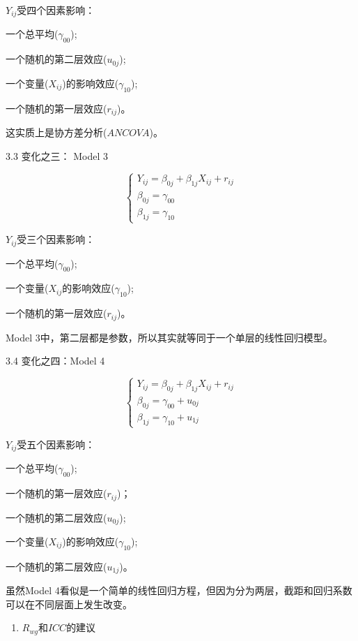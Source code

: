 \documentclass[
]{book}
\providecommand{\tightlist}{%
  \setlength{\itemsep}{0pt}\setlength{\parskip}{0pt}}
\begin{document}
\(Y_{ij}\)受四个因素影响：

一个总平均(\(\gamma_{00}\));

一个随机的第二层效应(\(u_{0j}\));

一个变量(\(X_{ij}\))的影响效应(\(\gamma_{10}\));

一个随机的第一层效应(\(r_{ij}\))。

这实质上是协方差分析(\(ANCOVA\))。

3.3 变化之三： Model 3

\[
\left\{ \begin{aligned} 
        Y_{ij} = \beta_{0j} + \beta_{1j}X_{ij}+ r_{ij} \\
        \beta_{0j} = \gamma_{00} \\
        \beta_{1j} = \gamma_{10}       
\end{aligned} \right.
\]

\(Y_{ij}\)受三个因素影响：

一个总平均(\(\gamma_{00}\));

一个变量(\(X_{ij}\)的影响效应(\(\gamma_{10}\));

一个随机的第一层效应(\(r_{ij}\))。

Model 3中，第二层都是参数，所以其实就等同于一个单层的线性回归模型。

3.4 变化之四：Model 4

\[
\left\{ \begin{aligned} 
        Y_{ij} = \beta_{0j} + \beta_{1j}X_{ij}+ r_{ij} \\
        \beta_{0j} = \gamma_{00} + u_{0j} \\
        \beta_{1j} = \gamma_{10} + u_{1j}       
\end{aligned} \right.
\]

\(Y_{ij}\)受五个因素影响：

一个总平均(\(\gamma_{00}\));

一个随机的第一层效应(\(r_{ij}\))；

一个随机的第二层效应(\(u_{0j}\));

一个变量(\(X_{ij}\))的影响效应(\(\gamma_{10}\));

一个随机的第二层效应(\(u_{1j}\))。

虽然Model 4看似是一个简单的线性回归方程，但因为分为两层，截距和回归系数可以在不同层面上发生改变。

\begin{enumerate}
\def\labelenumi{\arabic{enumi}.}
\setcounter{enumi}{3}
\tightlist
\item
  \(R_{wg}\)和\(ICC\)的建议
\end{enumerate}
\end{document}
